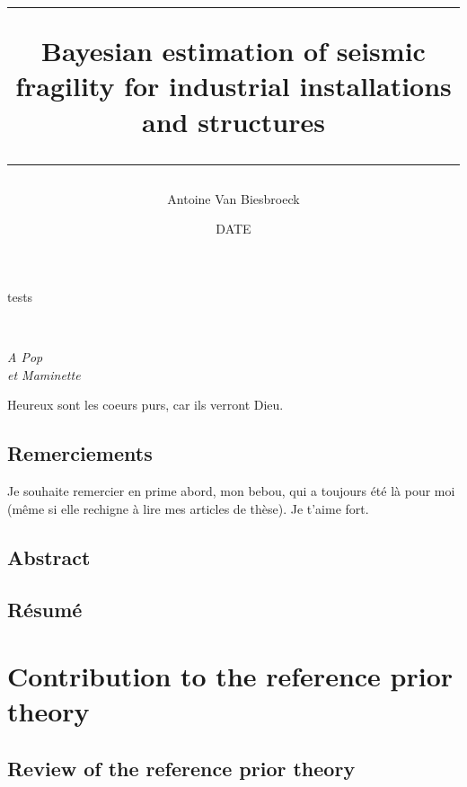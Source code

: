 \documentclass[a4paper]{book}
\title{\hrule\vspace*{0.5em}
    \textbf{Bayesian estimation of seismic fragility for industrial installations and structures}
    \vspace*{0.5em}\\ \hrule
    }
\author{Antoine Van Biesbroeck}
\date{DATE}
\renewcommand{\familydefault}{\sfdefault}
\begin{document}
\frontmatter
\pagestyle{empty}

tests

\newpage 
\normalsize
\renewcommand{\familydefault}{\rmdefault}
\normalfont


\maketitle

\ 
\vfill
\begin{FlushRight}\itshape
A Pop\\
et Maminette
\end{FlushRight}
\vfill
Heureux sont les coeurs purs, car ils verront Dieu.

\newpage
\mainmatter
\pagestyle{plain}

\chapter*{Remerciements}

Je souhaite remercier en prime abord, mon bebou, qui a toujours été là pour moi (même si elle rechigne à lire mes articles de thèse). Je t'aime fort. 

\newpage

\chapter*{Abstract}

\chapter*{Résumé}


\dominitoc
\tableofcontents
\newpage

\pagestyle{fancy}\thispagestyle{plain}





\part{Contribution to the reference prior theory}


\chapter{Review of the reference prior theory}
\end{document}
